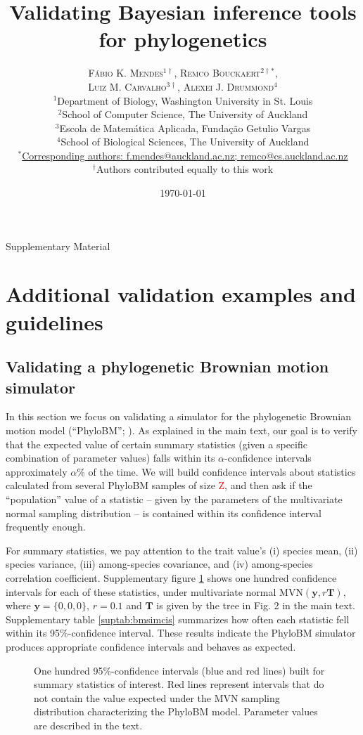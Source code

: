 \documentclass[oneside]{article}
\title{Validating Bayesian inference tools for phylogenetics} %
\author{\textsc{F\'{a}bio K. Mendes$^{1\dagger}$}, \textsc{Remco Bouckaert$^{2\dagger*}$},\\
\textsc{Luiz M. Carvalho$^{3\dagger}$}, \textsc{Alexei J. Drummond$^{4}$} \\
\small $^1$Department of Biology, Washington University in St. Louis\\
\small $^2$School of Computer Science, The University of Auckland\\
\small $^3$Escola de Matem\'{a}tica Aplicada, Fundaç\~{a}o Getulio Vargas\\
\small $^4$School of Biological Sciences, The University of Auckland\\
\small
\href{mailto:f.mendes@auckland.ac.nz}{$^*$Corresponding authors:
  f.mendes@auckland.ac.nz; remco@cs.auckland.ac.nz}\\
{\small $^\dagger$Authors contributed equally to this work}
}
\date{\today} %
\begin{document}
\maketitle

\begin{center}
    \Large Supplementary Material
\end{center}

\newpage
\section{Additional validation examples and guidelines}

\subsection{Validating a phylogenetic Brownian motion simulator}

In this section we focus on validating a simulator for the phylogenetic Brownian motion
model (``PhyloBM''; \citealp{felsenstein73}).
As explained in the main text, our goal is to verify that the expected value of certain
summary statistics (given a specific combination of parameter values) falls within its
$\alpha$-confidence intervals approximately $\alpha$\% of the time.
We will build confidence intervals about statistics calculated from several PhyloBM
samples of size \textcolor{red}{Z}, and then ask if the ``population'' value of 
a statistic -- given by the parameters of the multivariate normal sampling distribution --
is contained within its confidence interval frequently enough.

For summary statistics, we pay attention to the trait value's (i) species mean, (ii)
species variance, (iii) among-species covariance, and (iv) among-species correlation
coefficient.
Supplementary figure \ref{supfig:bmsimcis} shows one hundred confidence intervals for
each of these statistics, under multivariate normal $\text{MVN}(\boldsymbol{y},r\boldsymbol{T})$,
where $\boldsymbol{y}=\{0,0,0\}$, $r=0.1$ and $\boldsymbol{T}$ is given by the tree in
Fig. 2 in the main text.
Supplementary table \ref{suptab:bmsimcis} summarizes how often each statistic fell within
its 95\%-confidence interval.
These results indicate the PhyloBM simulator produces appropriate confidence intervals and behaves as expected.

\begin{figure}
  \centering
  
  \caption{One hundred 95\%-confidence intervals (blue and red
    lines) built for summary statistics of interest.
    Red lines represent intervals that do not contain the value
    expected under the MVN sampling distribution characterizing
    the PhyloBM model.
    Parameter values are described in the text.}
  \label{supfig:bmsimcis}
\end{figure}
\end{document}
